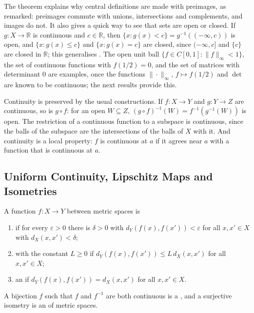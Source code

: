 The theorem explains why central definitions are made with preimages, as  remarked: preimages commute with unions, intersections and complements, and images do not. It also gives a quick way to see that sets are open or closed. If $g\colon X\to\mathbb R$ is continuous and $c\in\mathbb R$, then $\{x: g(x)<c\}=g^{-1}((-\infty,c))$ is open, and $\{x: g(x)\le c\}$ and $\{x: g(x)=c\}$ are closed, since $(-\infty,c]$ and $\{c\}$ are closed in $\mathbb R$; this generalises . The open unit ball $\{f\in C[0,1]: \|f\|_\infty<1\}$, the set of continuous functions with $f(1/2)=0$, and the set of matrices with determinant $0$ are examples, once the functions $\|\cdot\|_\infty$, $f\mapsto f(1/2)$ and $\det$ are known to be continuous; the next results provide this.

Continuity is preserved by the usual constructions. If $f\colon X\to Y$ and $g\colon Y\to Z$ are continuous, so is $g\circ f$: for an open $W\subseteq Z$, $(g\circ f)^{-1}(W)=f^{-1}(g^{-1}(W))$ is open. The restriction of a continuous function to a subspace is continuous, since the balls of the subspace are the intersections of the balls of $X$ with it. And continuity is a local property: $f$ is continuous at $a$ if it agrees near $a$ with a function that is continuous at $a$.

\subsection{Uniform Continuity, Lipschitz Maps and Isometries}

\begin{definition}
\label{def:uniform-lipschitz}
A function $f\colon X\to Y$ between metric spaces is
\begin{enumerate}
\item {} if for every $\varepsilon>0$ there is $\delta>0$ with $d_Y(f(x),f(x'))<\varepsilon$ for all $x,x'\in X$ with $d_X(x,x')<\delta$;
\item {} with the constant $L\ge0$ if $d_Y(f(x),f(x'))\le L\,d_X(x,x')$ for all $x,x'\in X$;
\item an  if $d_Y(f(x),f(x'))=d_X(x,x')$ for all $x,x'\in X$.
\end{enumerate}
A bijection $f$ such that $f$ and $f^{-1}$ are both continuous is a , and a surjective isometry is an  of metric spaces.
\end{definition}

